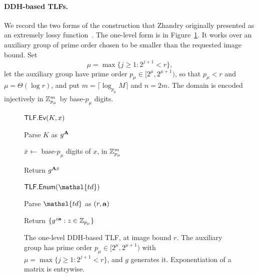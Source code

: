 \paragraph*{DDH-based TLFs.}
We record the two forms of the construction that Zhandry originally presented as
an extremely lossy function~\cite{C:Zhandry16,EPRINT:Zhandry16}. The one-level
form is in Figure~\ref{fig-tlf-ddh}. It works over an auxiliary group of prime
order chosen to be smaller than the requested image bound. Set
$$
\mu=\max\{j\ge1:2^{j+1}<r\},
$$
let the auxiliary group have prime order $p_\mu\in[2^\mu,2^{\mu+1})$, so that
$p_\mu<r$ and $\mu=\Theta(\log r)$, and put $m=\lceil\log_{p_\mu}M\rceil$ and
$n=2m$. The domain is encoded injectively in $\mathbb Z_{p_\mu}^{m}$ by base-$p_\mu$
digits.

\begin{figure}[t]
{
\begin{oracle}{$\mathsf{TLF}.\mathsf{Ev}(K,x)$}
\item Parse $K$ as $g^{\mathbf{A}}$
\item $\bar x\gets$ base-$p_\mu$ digits of $x$, in $\mathbb Z_{p_\mu}^{m}$
\item Return $g^{\mathbf{A}\bar x}$
\end{oracle}
\ExptSepSpace
\begin{oracle}{$\TLFEnum(\mathsl{td})$}
\item Parse $\mathsl{td}$ as $(r,\mathbf{a})$
\item Return $\{g^{z\mathbf{a}}:z\in\mathbb Z_{p_\mu}\}$
\end{oracle}
}
\vspace{-12pt}
\caption{The one-level DDH-based TLF, at image bound $r$. The auxiliary group
has prime order $p_\mu\in[2^\mu,2^{\mu+1})$ with $\mu=\max\{j\ge1:2^{j+1}<r\}$,
and $g$ generates it. Exponentiation of a matrix is entrywise.}\label{fig-tlf-ddh}
\vspace{-3pt}\hrulefill
\vspace{-1ex}
\end{figure}

